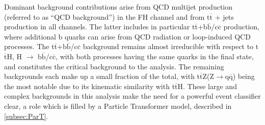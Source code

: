 \indent Dominant background contributions arise from QCD multijet production (referred to as “QCD background”) in the FH channel and from t$\overline{\text{t}}$ + jets production in all channels. The latter includes in particular t$\overline{\text{t}}$+b$\overline{\text{b}}$/c$\overline{\text{c}}$ production, where additional b quarks can arise from QCD radiation or loop-induced QCD processes. The t$\overline{\text{t}}$+b$\overline{\text{b}}$/c$\overline{\text{c}}$ background remains almost irreducible with respect to t$\overline{\text{t}}$H, H $\rightarrow$ b$\overline{\text{b}}$/c$\overline{\text{c}}$, with both processes having the same quarks in the final state, and constitutes the critical background to the analysis. The remaining backgrounds each make up a small fraction of the total, with t$\overline{\text{t}}$Z(Z$\rightarrow$q$\overline{\text{q}}$) being the most notable due to its kinematic similarity with t$\overline{\text{t}}$H. These large and complex backgrounds in this analysis make the need for a powerful event classifier clear, a role which is filled by a Particle Transformer \cite{ParticleTransformer} model, described in \ref{subsec:ParT}.
